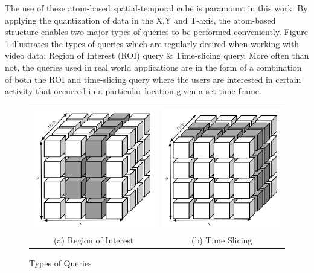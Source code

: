 The use of these atom-based spatial-temporal cube is paramount in this work. By applying the quantization of data in the X,Y and T-axis, the atom-based structure enables two major types of queries to be performed conveniently. Figure \ref{fig:typesofQuery} illustrates the types of queries which are regularly desired when working with video data: Region of Interest (ROI) query \& Time-slicing query. More often than not, the queries used in real world applications are in the form of a combination of both the ROI and time-slicing query where the users are interested in certain activity that occurred in a particular location given a set time frame. 



\begin{figure}[htb!]
  \centering
  

\begin{tabular}{cc}
 \includegraphics[width=0.4\linewidth]{image/general/atom_ROI.PNG} &  \includegraphics[width=0.4\linewidth]{image/general/atom_time_slicing.PNG}\\
(a) Region of Interest & (b) Time Slicing
\end{tabular}


\caption{Types of Queries} \label{fig:typesofQuery}
\end{figure}

